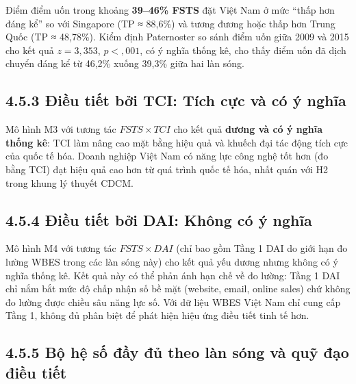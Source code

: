 \documentclass[
  a4paper,
  13pt]{extreport}
\begin{document}
Điểm điểm uốn trong khoảng \textbf{39--46\% FSTS} đặt Việt Nam ở mức
``thấp hơn đáng kể'' so với Singapore (TP ≈ 88,6\%) và tương đương hoặc
thấp hơn Trung Quốc (TP ≈ 48,78\%). Kiểm định Paternoster so sánh điểm
uốn giữa 2009 và 2015 cho kết quả \(z = 3{,}353\), \(p < {,}001\), có ý
nghĩa thống kê, cho thấy điểm uốn đã dịch chuyển đáng kể từ 46,2\% xuống
39,3\% giữa hai làn sóng.

\hypertarget{ux111iux1ec1u-tiux1ebft-bux1edfi-tci-tuxedch-cux1ef1c-vuxe0-cuxf3-uxfd-nghux129a}{%
\subsection{4.5.3 Điều tiết bởi TCI: Tích cực và có ý
nghĩa}\label{ux111iux1ec1u-tiux1ebft-bux1edfi-tci-tuxedch-cux1ef1c-vuxe0-cuxf3-uxfd-nghux129a}}

Mô hình M3 với tương tác \(FSTS \times TCI\) cho kết quả \textbf{dương
và có ý nghĩa thống kê}: TCI làm nâng cao mặt bằng hiệu quả và khuếch
đại tác động tích cực của quốc tế hóa. Doanh nghiệp Việt Nam có năng lực
công nghệ tốt hơn (đo bằng TCI) đạt hiệu quả cao hơn từ quá trình quốc
tế hóa, nhất quán với H2 trong khung lý thuyết CDCM.

\hypertarget{ux111iux1ec1u-tiux1ebft-bux1edfi-dai-khuxf4ng-cuxf3-uxfd-nghux129a}{%
\subsection{4.5.4 Điều tiết bởi DAI: Không có ý
nghĩa}\label{ux111iux1ec1u-tiux1ebft-bux1edfi-dai-khuxf4ng-cuxf3-uxfd-nghux129a}}

Mô hình M4 với tương tác \(FSTS \times DAI\) (chỉ bao gồm Tầng 1 DAI do
giới hạn đo lường WBES trong các làn sóng này) cho kết quả yếu dương
nhưng không có ý nghĩa thống kê. Kết quả này có thể phản ánh hạn chế về
đo lường: Tầng 1 DAI chỉ nắm bắt mức độ chấp nhận số bề mặt (website,
email, online sales) chứ không đo lường được chiều sâu năng lực số. Với
dữ liệu WBES Việt Nam chỉ cung cấp Tầng 1, không đủ phân biệt để phát
hiện hiệu ứng điều tiết tinh tế hơn.

\hypertarget{bux1ed9-hux1ec7-sux1ed1-ux111ux1ea7y-ux111ux1ee7-theo-luxe0n-suxf3ng-vuxe0-quux1ef9-ux111ux1ea1o-ux111iux1ec1u-tiux1ebft}{%
\subsection{4.5.5 Bộ hệ số đầy đủ theo làn sóng và quỹ đạo điều
tiết}\label{bux1ed9-hux1ec7-sux1ed1-ux111ux1ea7y-ux111ux1ee7-theo-luxe0n-suxf3ng-vuxe0-quux1ef9-ux111ux1ea1o-ux111iux1ec1u-tiux1ebft}}
\end{document}
